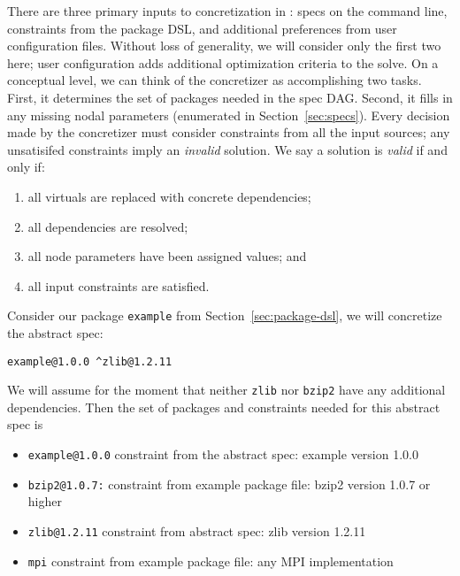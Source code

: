 There are three primary inputs to concretization in \spack: specs on the command line,
constraints from the package DSL, and additional preferences from user configuration
files. Without loss of generality, we will consider only the first two here; user
configuration adds additional optimization criteria to the solve.
%
%
%
On a conceptual level, we can think of the concretizer as accomplishing two tasks.
First, it determines the set of packages needed in the spec DAG. Second, it fills in any
missing nodal parameters (enumerated in Section~\ref{sec:specs}). Every decision made by
the concretizer must consider constraints from all the input sources; any unsatisifed
constraints imply an {\it invalid} solution. We say a solution is {\it valid} if and only if:
\begin{enumerate}
\item all virtuals are replaced with concrete dependencies;
\item all dependencies are resolved;
\item all node parameters have been assigned values; and
\item all input constraints are satisfied.
\end{enumerate}

Consider our package \texttt{example} from Section~\ref{sec:package-dsl}, we will
concretize the abstract spec:
\begin{verbatim}
example@1.0.0 ^zlib@1.2.11
\end{verbatim}
We will assume for the moment that neither \texttt{zlib} nor \texttt{bzip2} have any
additional dependencies. Then the set of packages and constraints needed for this
abstract spec is

\begin{itemize}
\item {\tt example@1.0.0} constraint from the abstract spec: example version 1.0.0
\item {\tt bzip2@1.0.7:} constraint from example package file: bzip2 version 1.0.7 or higher
\item {\tt zlib@1.2.11} constraint from abstract spec: zlib version 1.2.11
\item {\tt mpi} constraint from example package file: any MPI implementation
\end{itemize}

